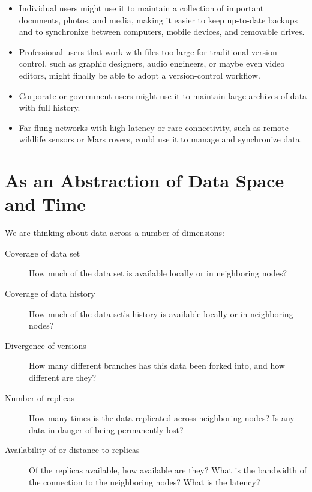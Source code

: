 \begin{itemize}

  \item Individual users might use it to maintain a collection of important
    documents, photos, and media, making it easier to keep up-to-date backups
    and to synchronize between computers, mobile devices, and removable drives.

  \item Professional users that work with files too large for traditional
    version control, such as graphic designers, audio engineers, or maybe even
    video editors, might finally be able to adopt a version-control workflow.

  \item Corporate or government users might use it to maintain large archives of
    data with full history.

  \item Far-flung networks with high-latency or rare connectivity, such as
    remote wildlife sensors or Mars rovers, could use it to manage and
    synchronize data.

\end{itemize}

%


\section{As an Abstraction of Data Space and Time}

We are thinking about data across a number of dimensions:

\begin{description}

  \item[Coverage of data set] How much of the data set is available locally or
    in neighboring nodes?

  \item[Coverage of data history] How much of the data set's history is
    available locally or in neighboring nodes?

  \item[Divergence of versions] How many different branches has this data been
    forked into, and how different are they?

  \item[Number of replicas] How many times is the data replicated across
    neighboring nodes? Is any data in danger of being permanently lost?

  \item[Availability of or distance to replicas] Of the replicas available, how
    available are they? What is the bandwidth of the connection to the
    neighboring nodes? What is the latency?

\end{description}

